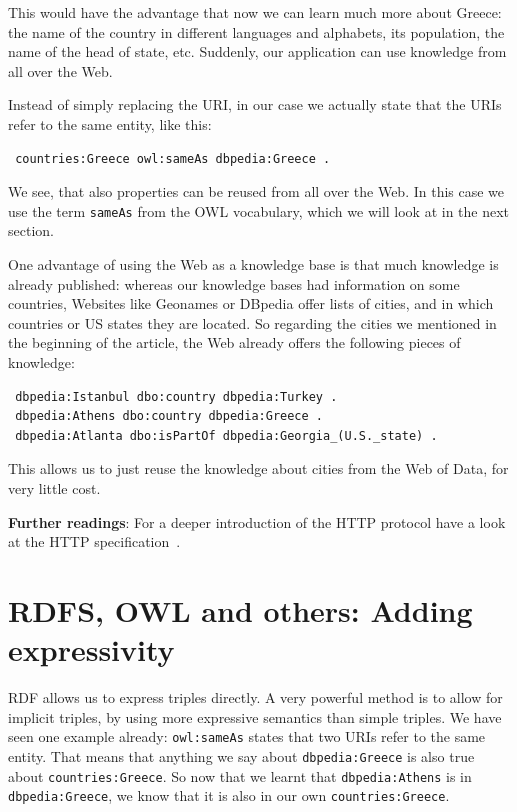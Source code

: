This would have the advantage that now we can learn much more about Greece: the name of the country in different languages and alphabets, its population, the name of the head of state, etc.
Suddenly, our application can use knowledge from all over the Web.

Instead of simply replacing the URI, in our case we actually state that the URIs refer to the same entity, like this:

\begin{verbatim}
 countries:Greece owl:sameAs dbpedia:Greece .
\end{verbatim}

We see, that also properties can be reused from all over the Web.
In this case we use the term \texttt{sameAs} from the OWL vocabulary, which we will look at in the next section.

One advantage of using the Web as a knowledge base is that much knowledge is already published:
whereas our knowledge bases had information on some countries, Websites like Geonames or DBpedia offer lists of cities, and in which countries or US states they are located.
So regarding the cities we mentioned in the beginning of the article, the Web already offers the following pieces of knowledge:

\begin{verbatim}
 dbpedia:Istanbul dbo:country dbpedia:Turkey .
 dbpedia:Athens dbo:country dbpedia:Greece .
 dbpedia:Atlanta dbo:isPartOf dbpedia:Georgia_(U.S._state) .
\end{verbatim}

This allows us to just reuse the knowledge about cities from the Web of Data, for very little cost.

\medskip

\textbf{Further readings}:
For a deeper introduction of the HTTP protocol have a look at the HTTP specification~\cite{http}.

\section{RDFS, OWL and others: Adding expressivity}
\label{rdfs}

RDF allows us to express triples directly.
A very powerful method is to allow for implicit triples, by using more expressive semantics than simple triples.
We have seen one example already: \texttt{owl:sameAs} states that two URIs refer to the same entity.
That means that anything we say about \texttt{dbpedia:Greece} is also true about \texttt{countries:Greece}.
So now that we learnt that \texttt{dbpedia:Athens} is in \texttt{dbpedia:Greece}, we know that it is also in our own \texttt{countries:Greece}.

